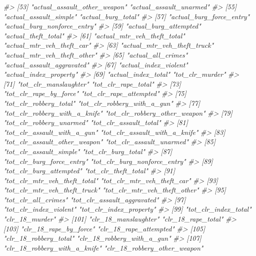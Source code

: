 \documentclass[
  12pt,
]{book}
\newenvironment{Shaded}{\begin{snugshade}}{\end{snugshade}}
\newcommand{\CommentTok}[1]{\textcolor[rgb]{0.56,0.35,0.01}{\textit{#1}}}
\begin{document}
\begin{Shaded}
\begin{Highlighting}[]
\CommentTok{\#>  [53] "actual\_assault\_other\_weapon"    "actual\_assault\_unarmed"        }
\CommentTok{\#>  [55] "actual\_assault\_simple"          "actual\_burg\_total"             }
\CommentTok{\#>  [57] "actual\_burg\_force\_entry"        "actual\_burg\_nonforce\_entry"    }
\CommentTok{\#>  [59] "actual\_burg\_attempted"          "actual\_theft\_total"            }
\CommentTok{\#>  [61] "actual\_mtr\_veh\_theft\_total"     "actual\_mtr\_veh\_theft\_car"      }
\CommentTok{\#>  [63] "actual\_mtr\_veh\_theft\_truck"     "actual\_mtr\_veh\_theft\_other"    }
\CommentTok{\#>  [65] "actual\_all\_crimes"              "actual\_assault\_aggravated"     }
\CommentTok{\#>  [67] "actual\_index\_violent"           "actual\_index\_property"         }
\CommentTok{\#>  [69] "actual\_index\_total"             "tot\_clr\_murder"                }
\CommentTok{\#>  [71] "tot\_clr\_manslaughter"           "tot\_clr\_rape\_total"            }
\CommentTok{\#>  [73] "tot\_clr\_rape\_by\_force"          "tot\_clr\_rape\_attempted"        }
\CommentTok{\#>  [75] "tot\_clr\_robbery\_total"          "tot\_clr\_robbery\_with\_a\_gun"    }
\CommentTok{\#>  [77] "tot\_clr\_robbery\_with\_a\_knife"   "tot\_clr\_robbery\_other\_weapon"  }
\CommentTok{\#>  [79] "tot\_clr\_robbery\_unarmed"        "tot\_clr\_assault\_total"         }
\CommentTok{\#>  [81] "tot\_clr\_assault\_with\_a\_gun"     "tot\_clr\_assault\_with\_a\_knife"  }
\CommentTok{\#>  [83] "tot\_clr\_assault\_other\_weapon"   "tot\_clr\_assault\_unarmed"       }
\CommentTok{\#>  [85] "tot\_clr\_assault\_simple"         "tot\_clr\_burg\_total"            }
\CommentTok{\#>  [87] "tot\_clr\_burg\_force\_entry"       "tot\_clr\_burg\_nonforce\_entry"   }
\CommentTok{\#>  [89] "tot\_clr\_burg\_attempted"         "tot\_clr\_theft\_total"           }
\CommentTok{\#>  [91] "tot\_clr\_mtr\_veh\_theft\_total"    "tot\_clr\_mtr\_veh\_theft\_car"     }
\CommentTok{\#>  [93] "tot\_clr\_mtr\_veh\_theft\_truck"    "tot\_clr\_mtr\_veh\_theft\_other"   }
\CommentTok{\#>  [95] "tot\_clr\_all\_crimes"             "tot\_clr\_assault\_aggravated"    }
\CommentTok{\#>  [97] "tot\_clr\_index\_violent"          "tot\_clr\_index\_property"        }
\CommentTok{\#>  [99] "tot\_clr\_index\_total"            "clr\_18\_murder"                 }
\CommentTok{\#> [101] "clr\_18\_manslaughter"            "clr\_18\_rape\_total"             }
\CommentTok{\#> [103] "clr\_18\_rape\_by\_force"           "clr\_18\_rape\_attempted"         }
\CommentTok{\#> [105] "clr\_18\_robbery\_total"           "clr\_18\_robbery\_with\_a\_gun"     }
\CommentTok{\#> [107] "clr\_18\_robbery\_with\_a\_knife"    "clr\_18\_robbery\_other\_weapon"   }

\end{Highlighting}
\end{Shaded}
\end{document}
